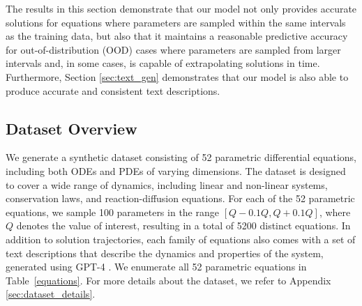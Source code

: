 \documentclass{article}
\begin{document}
The results in this section demonstrate that our model not only provides accurate solutions for equations where parameters are sampled within the same intervals as the training data, but also that it maintains a reasonable predictive accuracy for out-of-distribution (OOD) cases where parameters are sampled from larger intervals and, in some cases, is capable of extrapolating solutions in time. Furthermore, Section \ref{sec:text_gen} demonstrates that our model is also able to produce accurate and consistent text descriptions.

\subsection{Dataset Overview}\label{data}
We generate a synthetic dataset consisting of 52 parametric differential equations, including both ODEs and PDEs of varying dimensions. The dataset is designed to cover a wide range of dynamics, including linear and non-linear systems, conservation laws, and reaction-diffusion equations. For each of the 52 parametric equations, we sample 100 parameters in the range $[Q-0.1Q, Q+0.1Q]$, where $Q$ denotes the value of interest, resulting in a total of 5200 distinct equations. In addition to solution trajectories, each family of equations also comes with a set of text descriptions that describe the dynamics and properties of the system, generated using GPT-4 \cite{achiam2023gpt}. We enumerate all 52 parametric equations in Table~\ref{equations}. For more details about the dataset, we refer to Appendix \ref{sec:dataset_details}.
\end{document}
